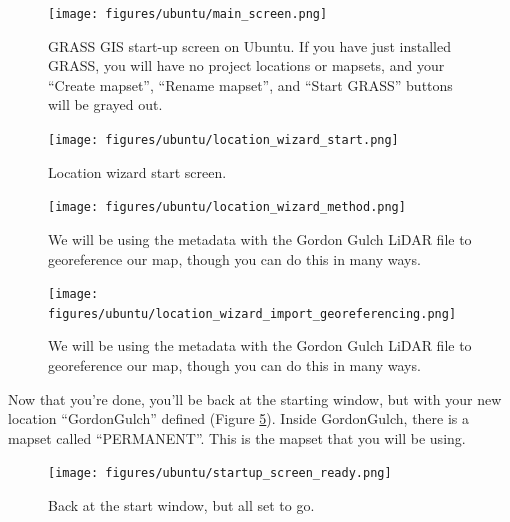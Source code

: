 \documentclass{book}
\begin{document}
\begin{figure}[h]
 \begin{center}
 \texttt{[image: figures/ubuntu/main\_screen.png]}
 \caption{GRASS GIS start-up screen on Ubuntu. If you have just installed GRASS, you will have no project locations or mapsets, and your ``Create mapset'', ``Rename mapset'', and ``Start GRASS'' buttons will be grayed out.}
 \label{fig:startup_screen}
 \end{center}
\end{figure}

\begin{figure}[h]
 \begin{center}
 \texttt{[image: figures/ubuntu/location\_wizard\_start.png]}
 \caption{Location wizard start screen.}
 \label{fig:location_wizard_start}
 \end{center}
\end{figure}

\begin{figure}[h]
 \begin{center}
 \texttt{[image: figures/ubuntu/location\_wizard\_method.png]}
 \caption{We will be using the metadata with the Gordon Gulch LiDAR file to georeference our map, though you can do this in many ways.}
 \label{fig:location_wizard_method}
 \end{center}
\end{figure}

\begin{figure}[h]
 \begin{center}
 \texttt{[image: figures/ubuntu/location\_wizard\_import\_georeferencing.png]}
 \caption{We will be using the metadata with the Gordon Gulch LiDAR file to georeference our map, though you can do this in many ways.}
 \label{fig:location_wizard_import_georeferencing}
 \end{center}
\end{figure}

Now that you're done, you'll be back at the starting window, but with your new location ``GordonGulch'' defined (Figure \ref{fig:startup_screen_ready}). Inside GordonGulch, there is a mapset called ``PERMANENT''. This is the mapset that you will be using.

\begin{figure}[h]
 \begin{center}
 \texttt{[image: figures/ubuntu/startup\_screen\_ready.png]}
 \caption{Back at the start window, but all set to go.}
 \label{fig:startup_screen_ready}
 \end{center}
\end{figure}
\end{document}
